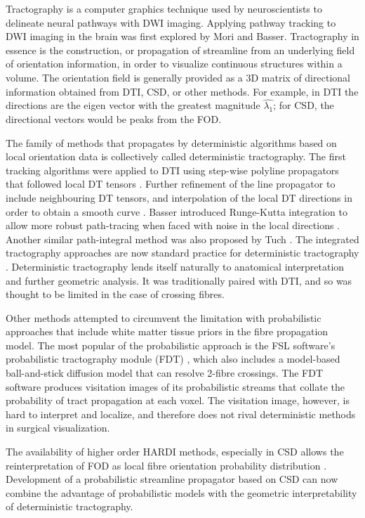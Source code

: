 Tractography is a computer graphics technique used by neuroscientists to delineate neural pathways with DWI imaging. Applying pathway tracking to DWI imaging in the brain was first explored by Mori \cite{Mori2002b} and Basser\cite{Basser2000}. Tractography in essence is the construction, or propagation of streamline from an underlying field of orientation information, in order to visualize continuous structures within a volume.  The orientation field is generally provided as a 3D matrix of directional information obtained from DTI, CSD, or other methods. For example, in DTI the directions are the eigen vector with the greatest magnitude $\hat{\lambda_1}$; for CSD, the directional vectors would be peaks from the FOD. 

The family of methods that propagates by deterministic algorithms based on local orientation data is collectively called deterministic tractography. The first tracking algorithms were applied to DTI using step-wise polyline propagators that followed local DT tensors \cite{Conturo1999}. Further refinement of the line propagator to include neighbouring DT tensors, and interpolation of the local DT directions in order to obtain a smooth curve \cite{Mori2002b}. Basser introduced Runge-Kutta integration to allow more robust path-tracing when faced with noise in the local directions \cite{Basser2000}. Another similar path-integral method was also proposed by Tuch \cite{Tuch2000d}. The integrated tractography approaches are now standard practice for deterministic tractography \cite{Tournier2004,Pieper2004}. Deterministic tractography lends itself naturally to anatomical interpretation and further geometric analysis. It was traditionally paired with DTI, and so was thought to be limited in the case of crossing fibres. 

Other methods attempted to circumvent the limitation with probabilistic approaches that include white matter tissue priors in the fibre propagation model. The most popular of the probabilistic approach is the FSL software's probabilistic tractography module (FDT) \cite{Behrens2007}, which also includes a model-based ball-and-stick diffusion model that can resolve 2-fibre crossings. The FDT software produces visitation images of its probabilistic streams that collate the probability of tract propagation at each voxel. The visitation image, however, is hard to interpret and localize, and therefore does not rival deterministic methods in surgical visualization.

The availability of higher order HARDI methods, especially in CSD allows the reinterpretation of FOD as local fibre orientation probability distribution \cite{Tournier2010,Jeurissen2011b}. Development of a probabilistic streamline propagator based on CSD can now combine the advantage of probabilistic models with the geometric interpretability of deterministic tractography. 

